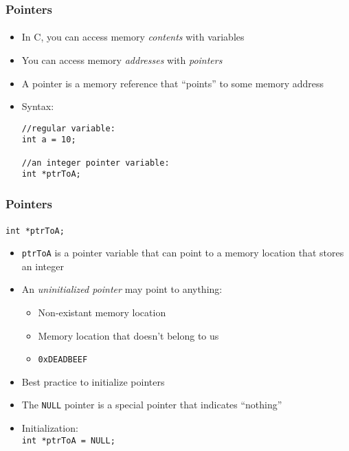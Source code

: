 \documentclass[]{beamer}
\begin{document}
\begin{frame}[fragile]
  \frametitle{Pointers}
  \framesubtitle{}

\begin{itemize}[<+->]
  \item In C, you can access memory \emph{contents} with variables
  \item You can access memory \emph{addresses} with \emph{pointers}
  \item A pointer is a memory reference that ``points'' to some memory address
  \item Syntax:
\begin{verbatim}
//regular variable:
int a = 10;

//an integer pointer variable:
int *ptrToA;
\end{verbatim}
\end{itemize}
  
\end{frame}

\begin{frame}[fragile]
  \frametitle{Pointers}
  \framesubtitle{}

\texttt{int *ptrToA;}
\begin{itemize}[<+->]
  \item \texttt{ptrToA} is a pointer variable that can point to a memory
  location that stores an integer
  \item An \emph{uninitialized pointer} may point to anything:
  \begin{itemize}
    \item Non-existant memory location
    \item Memory location that doesn't belong to us
    \item \texttt{0xDEADBEEF}
  \end{itemize}
  \item Best practice to initialize pointers
  \item The \texttt{NULL} pointer is a special pointer that indicates ``nothing''
  \item Initialization:\\
  \texttt{int *ptrToA = NULL;}
\end{itemize}
  
\end{frame}
\end{document}
